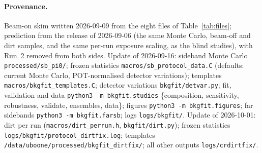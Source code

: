 \documentclass[11pt,a4paper]{article}
\begin{document}
\paragraph{Provenance.}\sloppy
Beam-on skim written 2026-09-09 from the eight files of Table~\ref{tab:files}; prediction
from the release of 2026-09-06 (the same Monte Carlo, beam-off and dirt samples, and the
same per-run exposure scaling, as the blind studies), with Run~2 removed from both sides.
Update of 2026-09-16: sideband Monte Carlo \texttt{processed/\allowbreak sb\_pi0/}; frozen statistics
\texttt{macros/sb\_protocol\_data.C} (defaults: current Monte Carlo, POT-normalised detector variations); templates
\texttt{macros/bkgfit\_templates.C}; detector variations \texttt{bkgfit/detvar.py}; fit, validation and data
\texttt{python3 -m bkgfit.studies} \{composition, sensitivity, robustness, validate, ensembles, data\}; figures
\texttt{python3 -m bkgfit.figures}; far sidebands \texttt{python3 -m bkgfit.farsb};
logs \texttt{logs/bkgfit/}. Update of 2026-10-01: dirt per run (\texttt{macros/dirt\_perrun.h},
\texttt{bkgfit/dirt.py}); frozen statistics \texttt{logs/bkgfit/protocol\_dirtfix.log}; templates
\texttt{/data/uboone/processed/\allowbreak bkgfit\_dirtfix/}; all other outputs \texttt{logs/crdirtfix/}.
\end{document}
